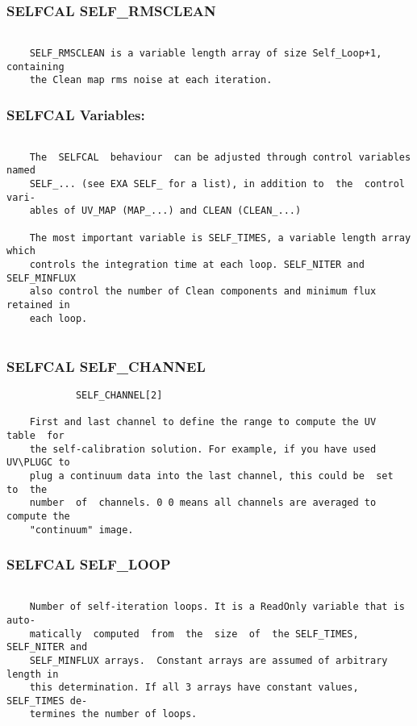 \subsubsection{SELFCAL SELF\_RMSCLEAN}
\begin{verbatim}

    SELF_RMSCLEAN is a variable length array of size Self_Loop+1, containing
    the Clean map rms noise at each iteration.

\end{verbatim}
\subsubsection{SELFCAL Variables:}
\begin{verbatim}

    The  SELFCAL  behaviour  can be adjusted through control variables named
    SELF_... (see EXA SELF_ for a list), in addition to  the  control  vari-
    ables of UV_MAP (MAP_...) and CLEAN (CLEAN_...)

    The most important variable is SELF_TIMES, a variable length array which
    controls the integration time at each loop. SELF_NITER and  SELF_MINFLUX
    also control the number of Clean components and minimum flux retained in
    each loop.


\end{verbatim}
\subsubsection{SELFCAL SELF\_CHANNEL}
\begin{verbatim}
            SELF_CHANNEL[2]

    First and last channel to define the range to compute the UV  table  for
    the self-calibration solution. For example, if you have used UV\PLUGC to
    plug a continuum data into the last channel, this could be  set  to  the
    number  of  channels. 0 0 means all channels are averaged to compute the
    "continuum" image.

\end{verbatim}
\subsubsection{SELFCAL SELF\_LOOP}
\begin{verbatim}

    Number of self-iteration loops. It is a ReadOnly variable that is  auto-
    matically  computed  from  the  size  of  the SELF_TIMES, SELF_NITER and
    SELF_MINFLUX arrays.  Constant arrays are assumed of arbitrary length in
    this determination. If all 3 arrays have constant values, SELF_TIMES de-
    termines the number of loops.

\end{verbatim}
